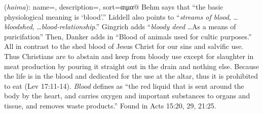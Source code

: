 \item[Blood,]
 
(\textit{haima}):
{
    name=,
    description={},
    sort=αιμα@
}
Behm says that ``the basic physiological meaning is `blood'.'' 
Liddell also points to ``\emph{streams of blood}, \ldots \emph{bloodshed}, \ldots \emph{blood-relationship}.'' 
Gingrich adds ``\emph{bloody deed} \ldots As a means of puricifation'' Then, Danker adds in ``Blood of animals used for cultic purposes.'' 
All in contrast to the shed blood of Jesus Christ for our sins and salvific use. Thus Christians are to abstain and keep from bloody use except for slaughter in meat production by pouring it straight out in the drain and nothing else. Because the life is in the blood and dedicated for the use at the altar, thus it is prohibited to eat (Lev 17:11-14). \emph{Blood} defines as “the red liquid that is sent around the body by the heart, and carries oxygen and important substances to organs and tissue, and removes waste products.”
Found in Acts 15:20, 29, 21:25.
